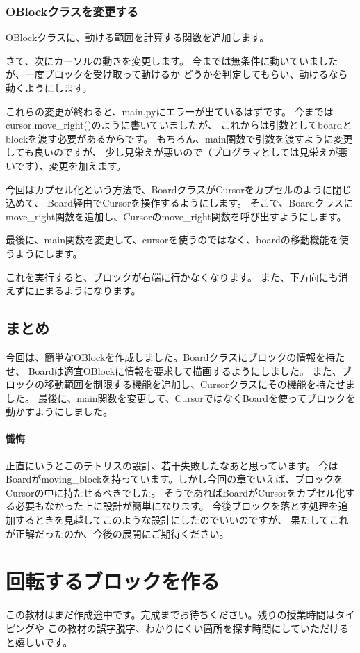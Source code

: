 \documentclass[12pt, a4paper, dvipdfmx]{book}
\begin{document}
\subsection{OBlockクラスを変更する}
OBlockクラスに、動ける範囲を計算する関数を追加します。

さて、次にカーソルの動きを変更します。
今までは無条件に動いていましたが、一度ブロックを受け取って動けるか
どうかを判定してもらい、動けるなら動くようにします。

これらの変更が終わると、main.pyにエラーが出ているはずです。
今まではcursor.move\_right()のように書いていましたが、
これからは引数としてboardとblockを渡す必要があるからです。
もちろん、main関数で引数を渡すように変更しても良いのですが、
少し見栄えが悪いので（プログラマとしては見栄えが悪いです）、変更を加えます。

今回はカプセル化という方法で、BoardクラスがCursorをカプセルのように閉じ込めて、
Board経由でCursorを操作するようにします。
そこで、Boardクラスにmove\_right関数を追加し、Cursorのmove\_right関数を呼び出すようにします。

最後に、main関数を変更して、cursorを使うのではなく、boardの移動機能を使うようにします。

これを実行すると、ブロックが右端に行かなくなります。
また、下方向にも消えずに止まるようになります。

\section{まとめ}
今回は、簡単なOBlockを作成しました。Boardクラスにブロックの情報を持たせ、
Boardは適宜OBlockに情報を要求して描画するようにしました。
また、ブロックの移動範囲を制限する機能を追加し、Cursorクラスにその機能を持たせました。
最後に、main関数を変更して、CursorではなくBoardを使ってブロックを動かすようにしました。

\subsubsection{懺悔}
正直にいうとこのテトリスの設計、若干失敗したなあと思っています。
今はBoardがmoving\_blockを持っています。しかし今回の章でいえば、ブロックをCursorの中に持たせるべきでした。
そうであればBoardがCursorをカプセル化する必要もなかった上に設計が簡単になります。
今後ブロックを落とす処理を追加するときを見越してこのような設計にしたのでいいのですが、
果たしてこれが正解だったのか、今後の展開にご期待ください。

\chapter{回転するブロックを作る}
この教材はまだ作成途中です。完成までお待ちください。残りの授業時間はタイピングや
この教材の誤字脱字、わかりにくい箇所を探す時間にしていただけると嬉しいです。
\end{document}
